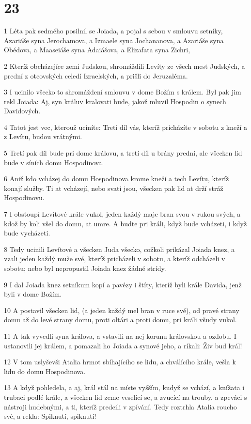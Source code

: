 \chapter{23}

\par 1 Léta pak sedmého posilnil se Joiada, a pojal s sebou v smlouvu setníky, Azariáše syna Jerochamova, a Izmaele syna Jochananova, a Azariáše syna Obédova, a Maaseiáše syna Adaiášova, a Elizafata syna Zichri,
\par 2 Kteríž obcházejíce zemi Judskou, shromáždili Levíty ze všech mest Judských, a prední z otcovských celedí Izraelských, a prišli do Jeruzaléma.
\par 3 I ucinilo všecko to shromáždení smlouvu v dome Božím s králem. Byl pak jim rekl Joiada: Aj, syn králuv kralovati bude, jakož mluvil Hospodin o synech Davidových.
\par 4 Tatot jest vec, kterouž uciníte: Tretí díl vás, kteríž pricházíte v sobotu z kneží a z Levítu, budou vrátnými.
\par 5 Tretí pak díl bude pri dome královu, a tretí díl u brány prední, ale všecken lid bude v síních domu Hospodinova.
\par 6 Aniž kdo vcházej do domu Hospodinova krome kneží a tech Levítu, kteríž konají služby. Ti at vcházejí, nebo svatí jsou, všecken pak lid at drží stráž Hospodinovu.
\par 7 I obstoupí Levítové krále vukol, jeden každý maje bran svou v rukou svých, a kdož by koli všel do domu, at umre. A budte pri králi, když bude vcházeti, i když bude vycházeti.
\par 8 Tedy ucinili Levítové a všecken Juda všecko, cožkoli prikázal Joiada knez, a vzali jeden každý muže své, kteríž pricházeli v sobotu, a kteríž odcházeli v sobotu; nebo byl nepropustil Joiada knez žádné strídy.
\par 9 I dal Joiada knez setníkum kopí a pavézy i štíty, kteríž byli krále Davida, jenž byli v dome Božím.
\par 10 A postavil všecken lid, (a jeden každý mel bran v ruce své), od pravé strany domu až do levé strany domu, proti oltári a proti domu, pri králi všudy vukol.
\par 11 A tak vyvedli syna králova, a vstavili na nej korunu královskou a ozdobu. I ustanovili jej králem, a pomazali ho Joiada a synové jeho, a ríkali: Živ bud král!
\par 12 V tom uslyševši Atalia hrmot sbíhajícího se lidu, a chválícího krále, vešla k lidu do domu Hospodinova.
\par 13 A když pohledela, a aj, král stál na míste vyšším, kudyž se vchází, a knížata i trubaci podlé krále, a všecken lid zeme veselící se, a zvucící na trouby, a zpeváci s nástroji hudebnými, a ti, kteríž predcili v zpívání. Tedy roztrhla Atalia roucho své, a rekla: Spiknutí, spiknutí!
